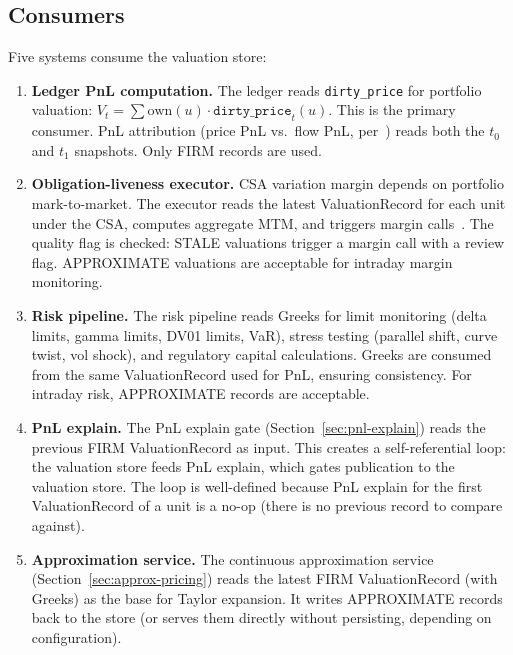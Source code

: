 \documentclass[11pt,a4paper]{article}
\begin{document}
\subsection{Consumers}

Five systems consume the valuation store:

\begin{enumerate}
\item \textbf{Ledger PnL computation.}  The ledger reads \texttt{dirty\_price} for portfolio valuation: $V_t = \sum \mathrm{own}(u) \cdot \texttt{dirty\_price}_t(u)$.  This is the primary consumer.  PnL attribution (price PnL vs.\ flow PnL, per~\cite[\S4.4]{ledger}) reads both the $t_0$ and $t_1$ snapshots.  Only FIRM records are used.

\item \textbf{Obligation-liveness executor.}  CSA variation margin depends on portfolio mark-to-market.  The executor reads the latest ValuationRecord for each unit under the CSA, computes aggregate MTM, and triggers margin calls~\cite[\S14.4.4]{ledger}.  The quality flag is checked: STALE valuations trigger a margin call with a review flag.  APPROXIMATE valuations are acceptable for intraday margin monitoring.

\item \textbf{Risk pipeline.}  The risk pipeline reads Greeks for limit monitoring (delta limits, gamma limits, DV01 limits, VaR), stress testing (parallel shift, curve twist, vol shock), and regulatory capital calculations.  Greeks are consumed from the same ValuationRecord used for PnL, ensuring consistency.  For intraday risk, APPROXIMATE records are acceptable.

\item \textbf{PnL explain.}  The PnL explain gate (Section~\ref{sec:pnl-explain}) reads the previous FIRM ValuationRecord as input.  This creates a self-referential loop: the valuation store feeds PnL explain, which gates publication to the valuation store.  The loop is well-defined because PnL explain for the first ValuationRecord of a unit is a no-op (there is no previous record to compare against).

\item \textbf{Approximation service.}  The continuous approximation service (Section~\ref{sec:approx-pricing}) reads the latest FIRM ValuationRecord (with Greeks) as the base for Taylor expansion.  It writes APPROXIMATE records back to the store (or serves them directly without persisting, depending on configuration).
\end{enumerate}
\end{document}
